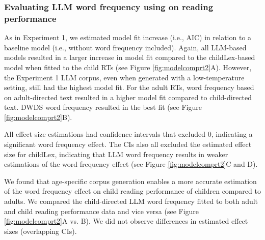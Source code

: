 \documentclass[doc, a4paper, anonymous]{apa7}
\begin{document}

\subsubsection*{Evaluating LLM word frequency using on reading performance}

As in Experiment 1, we estimated model fit increase (i.e.,  AIC) in relation to a baseline model (i.e., without word frequency included). Again, all LLM-based models resulted in a larger increase in model fit compared to the childLex-based model when fitted to the child RTs (see Figure \ref{fig:modelcomprt2}A). However, the Experiment 1 LLM corpus, even when generated with a low-temperature setting, still had the highest model fit. For the adult RTs, word frequency based on adult-directed text resulted in a higher model fit compared to child-directed text. DWDS word frequency resulted in the best fit (see Figure \ref{fig:modelcomprt2}B). 

All effect size estimations had confidence intervals that excluded 0, indicating a significant word frequency effect. The CIs also all excluded the estimated effect size for childLex, indicating that LLM word frequency results in weaker estimations of the word frequency effect (see Figure \ref{fig:modelcomprt2}C and D).

We found that age-specific corpus generation enables a more accurate estimation of the word frequency effect on child reading performance of children compared to adults. We compared the child-directed LLM word frequency fitted to both adult and child reading performance data and vice versa (see Figure \ref{fig:modelcomprt2}A vs. B). We did not observe differences in estimated effect sizes (overlapping CIs).  
\end{document}
